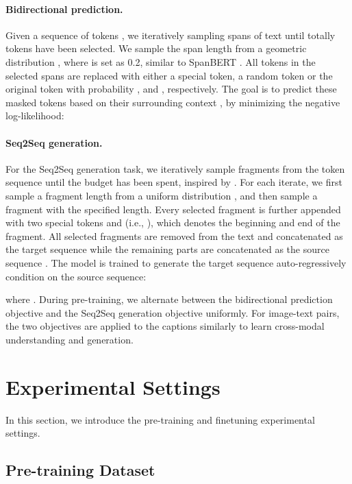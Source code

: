 \documentclass[11pt,a4paper]{article}
\begin{document}
\paragraph{Bidirectional prediction.} 
Given a sequence of tokens , we iteratively sampling spans of text until totally  tokens have been selected.
We sample the span length from a geometric distribution , where  is set as 0.2, similar to SpanBERT \citep{joshi-etal-2020-spanbert}.
All tokens in the selected spans are replaced with either a special  token, a random token or the original token with probability ,  and , respectively.
The goal is to predict these masked tokens  based on their surrounding context , by minimizing the negative log-likelihood:








\paragraph{Seq2Seq generation.} 
For the Seq2Seq generation task, we iteratively sample fragments from the token sequence until the  budget has been spent, inspired by \citet{xiao2020ernie}.
For each iterate, we first sample a fragment length from a uniform distribution , and then sample a fragment with the specified length.
Every selected fragment  is further appended with two special tokens  and  (i.e., ), which denotes the beginning and end of the fragment.
All selected fragments are removed from the text and concatenated as the target sequence  while the remaining parts are concatenated as the source sequence .
The model is trained to generate the target sequence auto-regressively condition on the source sequence:

where . During pre-training, we alternate between the bidirectional prediction objective and the Seq2Seq generation objective uniformly.
For image-text pairs, the two objectives are applied to the captions similarly to learn cross-modal understanding and generation.


\section{Experimental Settings}
\label{sec:set}

In this section, we introduce the pre-training and finetuning experimental settings.


\subsection{Pre-training Dataset}
\label{ssec:data}
\end{document}
